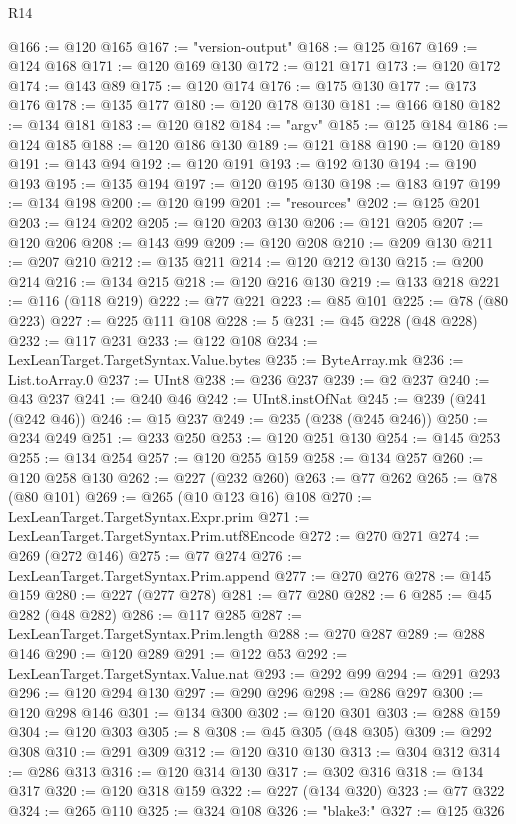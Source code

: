 \begin{lexlean}{R14}
\begin{coremodule}
@166 := @120 @165
@167 := "version-output"
@168 := @125 @167
@169 := @124 @168
@171 := @120 @169 @130
@172 := @121 @171
@173 := @120 @172
@174 := @143 @89
@175 := @120 @174
@176 := @175 @130
@177 := @173 @176
@178 := @135 @177
@180 := @120 @178 @130
@181 := @166 @180
@182 := @134 @181
@183 := @120 @182
@184 := "argv"
@185 := @125 @184
@186 := @124 @185
@188 := @120 @186 @130
@189 := @121 @188
@190 := @120 @189
@191 := @143 @94
@192 := @120 @191
@193 := @192 @130
@194 := @190 @193
@195 := @135 @194
@197 := @120 @195 @130
@198 := @183 @197
@199 := @134 @198
@200 := @120 @199
@201 := "resources"
@202 := @125 @201
@203 := @124 @202
@205 := @120 @203 @130
@206 := @121 @205
@207 := @120 @206
@208 := @143 @99
@209 := @120 @208
@210 := @209 @130
@211 := @207 @210
@212 := @135 @211
@214 := @120 @212 @130
@215 := @200 @214
@216 := @134 @215
@218 := @120 @216 @130
@219 := @133 @218
@221 := @116 (@118 @219)
@222 := @77 @221
@223 := @85 @101
@225 := @78 (@80 @223)
@227 := @225 @111 @108
@228 := 5
@231 := @45 @228 (@48 @228)
@232 := @117 @231
@233 := @122 @108
@234 := LexLeanTarget.TargetSyntax.Value.bytes
@235 := ByteArray.mk
@236 := List.toArray.{0}
@237 := UInt8
@238 := @236 @237
@239 := @2 @237
@240 := @43 @237
@241 := @240 @46
@242 := UInt8.instOfNat
@245 := @239 (@241 (@242 @46))
@246 := @15 @237
@249 := @235 (@238 (@245 @246))
@250 := @234 @249
@251 := @233 @250
@253 := @120 @251 @130
@254 := @145 @253
@255 := @134 @254
@257 := @120 @255 @159
@258 := @134 @257
@260 := @120 @258 @130
@262 := @227 (@232 @260)
@263 := @77 @262
@265 := @78 (@80 @101)
@269 := @265 (@10 @123 @16) @108
@270 := LexLeanTarget.TargetSyntax.Expr.prim
@271 := LexLeanTarget.TargetSyntax.Prim.utf8Encode
@272 := @270 @271
@274 := @269 (@272 @146)
@275 := @77 @274
@276 := LexLeanTarget.TargetSyntax.Prim.append
@277 := @270 @276
@278 := @145 @159
@280 := @227 (@277 @278)
@281 := @77 @280
@282 := 6
@285 := @45 @282 (@48 @282)
@286 := @117 @285
@287 := LexLeanTarget.TargetSyntax.Prim.length
@288 := @270 @287
@289 := @288 @146
@290 := @120 @289
@291 := @122 @53
@292 := LexLeanTarget.TargetSyntax.Value.nat
@293 := @292 @99
@294 := @291 @293
@296 := @120 @294 @130
@297 := @290 @296
@298 := @286 @297
@300 := @120 @298 @146
@301 := @134 @300
@302 := @120 @301
@303 := @288 @159
@304 := @120 @303
@305 := 8
@308 := @45 @305 (@48 @305)
@309 := @292 @308
@310 := @291 @309
@312 := @120 @310 @130
@313 := @304 @312
@314 := @286 @313
@316 := @120 @314 @130
@317 := @302 @316
@318 := @134 @317
@320 := @120 @318 @159
@322 := @227 (@134 @320)
@323 := @77 @322
@324 := @265 @110
@325 := @324 @108
@326 := "blake3:"
@327 := @125 @326

\end{coremodule}
\end{lexlean}
